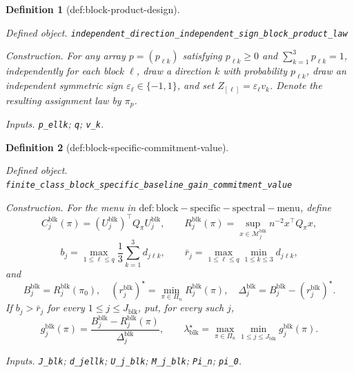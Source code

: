 \documentclass{article}
\newtheorem{definition}{Definition}
\begin{document}
\begin{definition}[def:block-product-design]\label{def:block-product-design}
\par\smallskip\noindent\emph{Defined object.} \texttt{independent\_\allowbreak{}direction\_\allowbreak{}independent\_\allowbreak{}sign\_\allowbreak{}block\_\allowbreak{}product\_\allowbreak{}law}
\par\smallskip\noindent\emph{Construction.} For any array \(p=(p_{\ell k})\) satisfying \(p_{\ell k}\ge0\) and \(\sum_{k=1}^3p_{\ell k}=1\), independently for each block \(\ell\), draw a direction \(k\) with probability \(p_{\ell k}\), draw an independent symmetric sign \(\varepsilon_\ell\in\{-1,1\}\), and set \(Z_{[\ell]}=\varepsilon_\ell v_k\). Denote the resulting assignment law by \(\pi_p\).
\par\smallskip\noindent\emph{Inputs.} \texttt{p\_\allowbreak{}ellk}; \texttt{q}; \texttt{v\_\allowbreak{}k}.
\end{definition}

\begin{definition}[def:block-specific-commitment-value]\label{def:block-specific-commitment-value}
\par\smallskip\noindent\emph{Defined object.} \texttt{finite\_\allowbreak{}class\_\allowbreak{}block\_\allowbreak{}specific\_\allowbreak{}baseline\_\allowbreak{}gain\_\allowbreak{}commitment\_\allowbreak{}value}
\par\smallskip\noindent\emph{Construction.} For the menu in \(\mathrm{def:block-specific-spectral-menu}\), define
\[
C_j^{\mathrm{blk}}(\pi)
=(U_j^{\mathrm{blk}})^\top Q_\pi U_j^{\mathrm{blk}},
\qquad
R_j^{\mathrm{blk}}(\pi)
=\sup_{x\in\mathcal M_j^{\mathrm{blk}}}n^{-2}x^\top Q_\pi x,
\]
\[
b_j=\max_{1\le\ell\le q}\frac13\sum_{k=1}^3d_{j\ell k},
\qquad
\bar r_j=\max_{1\le\ell\le q}\min_{1\le k\le3}d_{j\ell k},
\]
and
\[
B_j^{\mathrm{blk}}=R_j^{\mathrm{blk}}(\pi_0),
\quad
(r_j^{\mathrm{blk}})^\star=\min_{\pi\in\Pi_n}R_j^{\mathrm{blk}}(\pi),
\quad
\Delta_j^{\mathrm{blk}}=B_j^{\mathrm{blk}}-(r_j^{\mathrm{blk}})^\star.
\]
If \(b_j>\bar r_j\) for every \(1\le j\le J_{\mathrm{blk}}\), put, for every such \(j\),
\[
g_j^{\mathrm{blk}}(\pi)
=\frac{B_j^{\mathrm{blk}}-R_j^{\mathrm{blk}}(\pi)}{\Delta_j^{\mathrm{blk}}},
\qquad
\lambda_{\mathrm{blk}}^\star
=\max_{\pi\in\Pi_n}\min_{1\le j\le J_{\mathrm{blk}}}g_j^{\mathrm{blk}}(\pi).
\]
\par\smallskip\noindent\emph{Inputs.} \texttt{J\_\allowbreak{}blk}; \texttt{d\_\allowbreak{}jellk}; \texttt{U\_\allowbreak{}j\_\allowbreak{}blk}; \texttt{M\_\allowbreak{}j\_\allowbreak{}blk}; \texttt{Pi\_\allowbreak{}n}; \texttt{pi\_\allowbreak{}0}.
\end{definition}
\end{document}
